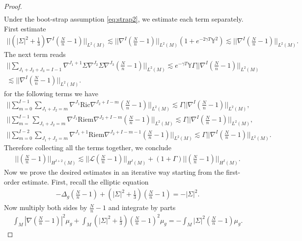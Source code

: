 \documentclass{amsart}
\begin{document}
\begin{proof}
\begin{align}
\end{align}
Under the boot-strap assumption \ref{eq:strap2}, we estimate each term separately. First estimate
\begin{align}
||(|\Sigma|^{2}+\frac{1}{3})\nabla^{I}(\frac{N}{n}-1)||_{L^{2}(M)}\lesssim \nonumber||\nabla^{I}(\frac{N}{n}-1)||_{L^{2}(M)}(1+e^{-2\gamma T}\mathds{Y}^{2})\lesssim ||\nabla^{I}(\frac{N}{n}-1)||_{L^{2}(M)}.    
\end{align}
The next term reads 
\begin{align}
 ||\sum_{J_{1}+J_{2}+J_{3}=I-1}\nabla^{J_{1}+1}\Sigma\nabla^{J_{2}}\Sigma\nabla^{J_{3}}(\frac{N}{n}-1)||_{L^{2}(M)}\lesssim e^{-\gamma T}\mathds{Y}\Gamma ||\nabla^{I}(\frac{N}{n}-1)||_{L^{2}(M)}\\\nonumber\lesssim ||\nabla^{I}(\frac{N}{n}-1)||_{L^{2}(M)}.   
\end{align}
for the following terms we have 
\begin{align}
||\sum_{m=0}^{I-1}\sum_{J_{1}+J_{2}=m}\nabla^{J_{1}}\text{Ric}\nabla^{J_{2}+I-m}(\frac{N}{n}-1)||_{L^{2}(M)}\lesssim \Gamma ||\nabla^{I}(\frac{N}{n}-1)||_{L^{2}(M)},\\\nonumber 
||\sum_{m=}^{I-1}\sum_{J_{1}+J_{2}=m}\nabla^{J_{1}}\text{Riem}\nabla^{J_{2}+I-m}(\frac{N}{n}-1)||_{L^{2}(M)}\lesssim \Gamma ||\nabla^{I}(\frac{N}{n}-1)||_{L^{2}(M)},\\\nonumber
||\sum_{m=0}^{I-2}\sum_{J_{1}+J_{2}=m}\nabla^{J_{1}+1}\text{Riem}\nabla^{J_{2}+I-m-1}(\frac{N}{n}-1)||_{L^{2}(M)}\lesssim \Gamma ||\nabla^{I}(\frac{N}{n}-1)||_{L^{2}(M)}.
\end{align}
Therefore collecting all the terms together, we conclude 
\begin{align}
\label{eq:iteratenew}
||(\frac{N}{n}-1)||_{H^{I+2}(M)}\lesssim ||\mathscr{L}(\frac{N}{n}-1)||_{H^{I}(M)}+(1+\Gamma)||(\frac{N}{n}-1)||_{H^{I}(M)}.    
\end{align}
Now we prove the desired estimates in an iterative way starting from the first-order estimate. First, recall the elliptic equation 
\begin{align}
-\Delta_{g}(\frac{N}{n}-1)+(|\Sigma|^{2}+\frac{1}{3})(\frac{N}{n}-1)=-|\Sigma|^{2}.     
\end{align}
Now multiply both sides by $\frac{N}{n}-1$ and integrate by parts 
\begin{align}
\label{eq:intby}
 \int_{M}|\nabla(\frac{N}{n}-1)|^{2}\mu_{g}+\int_{M}(|\Sigma|^{2}+\frac{1}{3})(\frac{N}{n}-1)^{2}\mu_{g}=-\int_{M}|\Sigma|^{2}(\frac{N}{n}-1)\mu_{g}.   
\end{align}

\end{proof}
\end{document}
